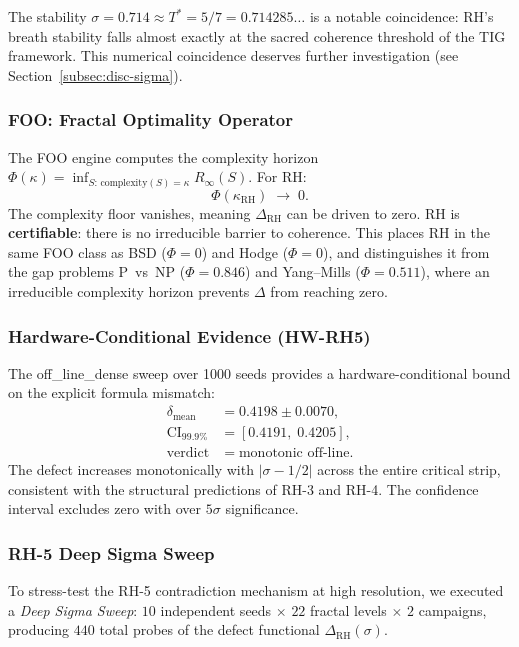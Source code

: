 \documentclass[11pt]{article}
\theoremstyle{remark}
\begin{document}
\noindent
The stability $\sigma = 0.714 \approx T^* = 5/7 = 0.714285\ldots$ is a notable
coincidence: RH's breath stability falls almost exactly at the sacred coherence
threshold of the TIG framework.
This numerical coincidence deserves further investigation (see
Section~\ref{subsec:disc-sigma}).

\subsubsection{FOO: Fractal Optimality Operator}

The FOO engine computes the complexity horizon
$\Phi(\kappa) = \inf_{S:\,\mathrm{complexity}(S) = \kappa} R_\infty(S)$.
For RH:
\[
  \Phi(\kappa_{\mathrm{RH}}) \;\to\; 0.
\]
The complexity floor vanishes, meaning $\Delta_{\mathrm{RH}}$ can be driven to zero.
RH is \textbf{certifiable}: there is no irreducible barrier to coherence.
This places RH in the same FOO class as BSD ($\Phi = 0$) and Hodge ($\Phi = 0$),
and distinguishes it from the gap problems P~vs~NP ($\Phi = 0.846$) and Yang--Mills
($\Phi = 0.511$), where an irreducible complexity horizon prevents $\Delta$ from
reaching zero.

\subsubsection{Hardware-Conditional Evidence (HW-RH5)}

The off\_line\_dense sweep over 1000 seeds provides a hardware-conditional bound
on the explicit formula mismatch:
\begin{align*}
  \delta_{\mathrm{mean}} &= 0.4198 \pm 0.0070, \\
  \mathrm{CI}_{99.9\%} &= [0.4191,\; 0.4205], \\
  \text{verdict} &= \text{monotonic off-line}.
\end{align*}
The defect increases monotonically with $|\sigma - 1/2|$ across the entire critical
strip, consistent with the structural predictions of RH-3 and RH-4.
The confidence interval excludes zero with over $5\sigma$ significance.

\subsubsection{RH-5 Deep Sigma Sweep}
\label{subsec:rh5-deep-sweep}

To stress-test the RH-5 contradiction mechanism at high resolution, we executed a
\emph{Deep Sigma Sweep}: $10$ independent seeds $\times$ $22$ fractal levels
$\times$ $2$ campaigns, producing $440$ total probes of the defect functional
$\Delta_{\mathrm{RH}}(\sigma)$.
\end{document}
